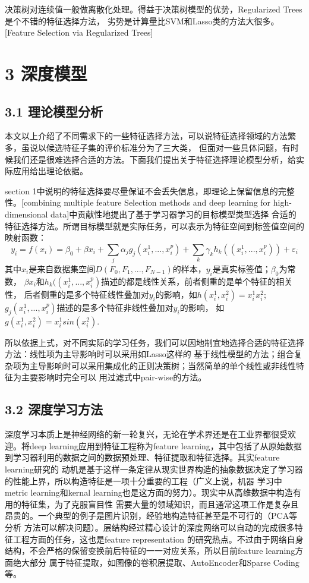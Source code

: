 \documentclass[a4paper,UTF8]{article}
\begin{document}
决策树对连续值一般做离散化处理。得益于决策树模型的优势，Regularized Trees是个不错的特征选择方法，
劣势是计算量比SVM和Lasso类的方法大很多。[Feature Selection via Regularized Trees]


\section*{3 深度模型}


\subsection*{3.1 理论模型分析}

本文以上介绍了不同需求下的一些特征选择方法，可以说特征选择领域的方法繁多，虽说以候选特征子集的评价标准分为了三大类，
但面对一些具体问题，有时候我们还是很难选择合适的方法。下面我们提出关于特征选择理论模型分析，给实际应用给出理论依据。

section 1中说明的特征选择要尽量保证不会丢失信息，即理论上保留信息的完整性。[combining multiple feature Selection
methods and deep learning for high-dimensional data]中贡献性地提出了基于学习器学习的目标模型类型选择
合适的特征选择方法。所谓目标模型就是实际任务，可以表示为特征空间到标签值空间的映射函数：
$$y_{i}=f(x_{i})=\beta_{0}+\beta x_{i}+\sum_{j}{\alpha_{j} g_{j}(x_{i}^{1},...,x_{i}^{p})}
+\sum_{k}{\gamma_{k} h_{k}((x_{i}^{1},...,x_{i}^{p}))}+\varepsilon_{i}$$
其中$x_{i}$是来自数据集空间$D(F_{0}, F_{1},..., F_{N-1})$的样本，$y_{i}$是真实标签值；$\beta_{0}$为常数，
$\beta x_{i}$和$h_{k}((x_{i}^{1},...,x_{i}^{p})$描述的都是线性关系，前者侧重的是单个特征的相关性，
后者侧重的是多个特征线性叠加对$y_{i}$的影响，如$h(x_{i}^{1},x_{i}^{2})=x_{i}^{1}x_{i}^{2}$;
$g_{j}(x_{i}^{1},...,x_{i}^{p})$描述的是多个特征非线性叠加对$y_{i}$的影响，
如$g(x_{i}^{1},x_{i}^{2})=x_{i}^{1}sin(x_{i}^{2})$.

所以依据上式，对不同实际的学习任务，我们可以因地制宜地选择合适的特征选择方法：线性项为主导影响时可以采用如Lasso这样的
基于线性模型的方法；组合复杂项为主导影响时可以采用集成化的正则决策树；当然简单的单个线性或非线性特征为主要影响时完全可以
用过滤式中pair-wise的方法。


\subsection*{3.2 深度学习方法}
深度学习本质上是神经网络的新一轮复兴，无论在学术界还是在工业界都很受欢迎。将deep learning应用到特征工程称为feature
learning，其中包括了从原始数据到学习器利用的数据之间的数据预处理、特征提取和特征选择。其实feature learning研究的
动机是基于这样一条定律从现实世界构造的抽象数据决定了学习器的性能上界，所以构造特征是一项十分重要的工程（广义上说，机器
学习中metric learning和kernal learning也是这方面的努力）。现实中从高维数据中构造有用的特征集，为了克服盲目性
需要大量的领域知识，而且通常这项工作是复杂且昂贵的。一个典型的例子是图片识别，经验地构造特征甚至是不可行的（PCA等分析
方法可以解决问题）。层结构经过精心设计的深度网络可以自动的完成很多特征工程方面的任务，这也是feature representation
的研究热点。不过由于网络自身结构，不会严格的保留变换前后特征的一一对应关系，所以目前feature learning方面绝大部分
属于特征提取，如图像的卷积层提取、AutoEncoder和Sparse Coding等。
\end{document}
